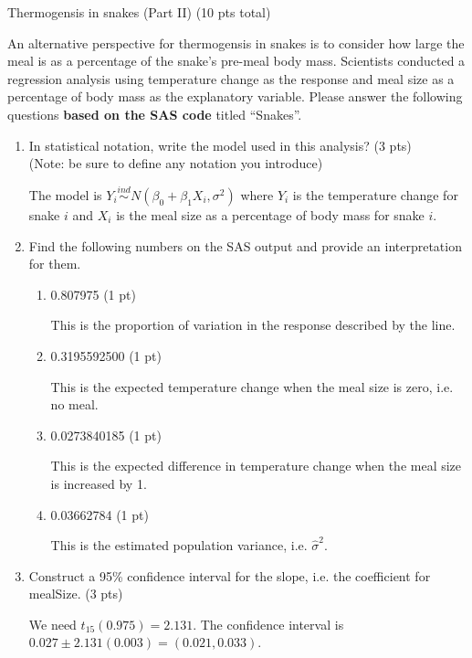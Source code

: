 \documentclass[10pt]{article}
\newcommand{\bigbrk}{\vspace*{2in}}
\newcommand{\smallbrk}{\vspace*{.3in}}
\newcommand{\shortcorrect}[1]{{\color{red} #1}}
\newcommand{\longcorrect}[2][\bigbrk]{{\color{red} #2}}
\newcommand{\shortcorrect}[1]{{\phantom{33.33}}}
\newcommand{\longcorrect}[2][\bigbrk]{#1}
\begin{document}
\newpage
\noindent \begin{Large}Thermogensis in snakes (Part II) (10 pts total) \end{Large}

An alternative perspective for thermogensis in snakes is to consider how large the meal is as a percentage of the snake's pre-meal body mass. Scientists conducted a regression analysis using temperature change as the response and meal size as a percentage of body mass as the explanatory variable. Please answer the following questions {\bf based on the SAS code} titled ``Snakes''.

\begin{enumerate}
\item In statistical notation, write the model used in this analysis? (3 pts)\\
(Note: be sure to define any notation you introduce)

\longcorrect{The model is $Y_i\stackrel{ind}{\sim} N(\beta_0+\beta_1 X_i,\sigma^2)$ where $Y_i$ is the temperature change for snake $i$ and $X_i$ is the meal size as a percentage of body mass for snake $i$.}

\item Find the following numbers on the SAS output and provide an interpretation for them.


\begin{enumerate}
\item 0.807975 (1 pt)

\shortcorrect{This is the proportion of variation in the response described by the line.}\smallbrk

\item 0.3195592500 (1 pt)

\shortcorrect{This is the expected temperature change when the meal size is zero, i.e. no meal. }\smallbrk

\item 0.0273840185 (1 pt)

\shortcorrect{This is the expected difference in temperature change when the meal size is increased by 1.}\smallbrk

\item 0.03662784 (1 pt)

\shortcorrect{This is the estimated population variance, i.e. $\hat{\sigma}^2$.}\smallbrk


\end{enumerate}

\item Construct a 95\% confidence interval for the slope, i.e. the coefficient for mealSize. (3 pts)

\shortcorrect{We need $t_{15}(0.975) = 2.131$. The confidence interval is 
$0.027 \pm 2.131(0.003) = (0.021,0.033)$.}\smallbrk

\end{enumerate}
\end{document}
